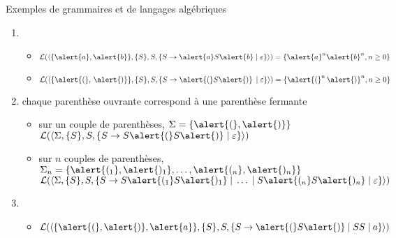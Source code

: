 
\begingroup

\begin{frame}{Exemples de grammaires et de langages algébriques}
  \begin{enumerate}
  \item {}\vspace{2mm}
    \begin{itemize}
    \item $\mathcal{L}(\langle\{\alert{a}, \alert{b}\},\{S\},S,\{S \rightarrow \alert{a}S\alert{b} \;|\; \varepsilon\}\rangle) = \{\alert{a}^n\alert{b}^n, n\geq 0\}$\\
    \item $\mathcal{L}(\langle\{\alert{(}, \, \alert{)}\},\{S\},S,\{S \rightarrow \alert{(}S\alert{)}\, \;|\;\varepsilon \}\rangle) = \{\alert{(}^n\, \alert{)}^n, n\geq 0\}$
    \end{itemize}
    
  \item {}\vspace{2mm}

    chaque parenthèse ouvrante correspond à une parenthèse fermante
    \begin{itemize}
    \item sur un couple de parenthèses, $\Sigma = \{\alert{(}, \alert{)}\}$\\
      $\mathcal{L}(\langle \Sigma ,\{S\},S,\{S \rightarrow S\alert{(}S\alert{)} \;|\; \varepsilon \}\rangle)$
    \item sur $n$ couples de parenthèses, $\Sigma_n = \{\alert{(_1}, \alert{)_1}, \ldots, \alert{(_n}, \alert{)_n}\}$\\
      $\mathcal{L}(\langle \Sigma ,\{S\},S,\{S \rightarrow S\alert{(_1}S\alert{)_1} \;|\; \ldots \;|\;S\alert{(_n}S\alert{)_n} \;|\; \varepsilon \}\rangle)$
    \end{itemize}
    \vspace{2mm}
    
  \item {}\vspace{2mm}
    
    \begin{itemize}
    \item $\mathcal{L}(\langle \{\alert{(}, \alert{)}, \alert{a}\} ,\{S\},S,\{S \rightarrow \alert{(}S\alert{)} \;|\; SS \;|\; a\}\rangle)$
    \end{itemize}
    \vspace{2mm}
    

\end{enumerate}
\end{frame}
